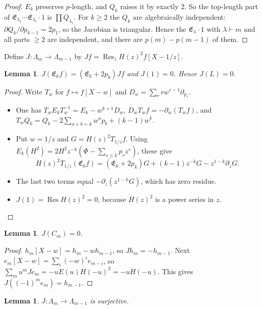 \documentclass[11pt]{article}
\newtheorem{lemma}[theorem]{Lemma}
\theoremstyle{definition}
\theoremstyle{remark}
\newcommand{\La}{\Lambda}
\newcommand{\Res}{\operatorname{Res}}
\newcommand{\fE}{\mathfrak{E}}
\begin{document}
\begin{proof}
$E_k$ preserves $p$-length, and $Q_k$ raises it by exactly $2$. So the top-length part of
$\fE_{\lambda_1}\cdots\fE_{\lambda_l}\cdot1$ is $\prod Q_{\lambda_i}$. For $k\ge2$ the $Q_k$ are algebraically
independent: $\partial Q_k/\partial p_{k-1}=2p_1$, so the Jacobian is triangular. Hence the $\fE_\lambda\cdot1$
with $\lambda\vdash m$ and all parts $\ge2$ are independent, and there are $p(m)-p(m-1)$ of them.
\end{proof}

Define $J\colon\La_m\to\La_{m-1}$ by $Jf=\Res_zH(z)^2f[X-1/z]$.

\begin{lemma}\label{intertw}
$J(\fE_kf)=(\fE_k+2p_k)Jf$ and $J(1)=0$. Hence $J(L)=0$.
\end{lemma}

\begin{proof}
Write $T_w$ for $f\mapsto f[X-w]$ and $D_w=\sum_rrw^{r-1}\partial_{p_r}$.
\begin{itemize}
\item One has $T_wE_kT_w^{-1}=E_k-w^{k+1}D_w$, $D_wT_wf=-\partial_w(T_wf)$, and
$T_wQ_k=Q_k-2\sum_{a+b=k}w^ap_b+(k-1)w^k$.
\item Put $w=1/z$ and $G=H(z)^2T_{1/z}f$. Using $E_k(H^2)=2H^2z^{-k}(\Phi-\sum_{s\le k}p_sz^s)$, these give
\[
  H(z)^2T_{1/z}(\fE_kf)=(\fE_k+2p_k)G+(k-1)z^{-k}G-z^{1-k}\partial_zG .
\]
\item The last two terms equal $-\partial_z(z^{1-k}G)$, which has zero residue.
\item $J(1)=\Res H(z)^2=0$, because $H(z)^2$ is a power series in $z$.
\end{itemize}
\end{proof}

\begin{lemma}\label{Jkill}
$J(C_m)=0$.
\end{lemma}

\begin{proof}
$h_m[X-w]=h_m-wh_{m-1}$, so $Jh_m=-h_{m-1}$. Next $e_m[X-w]=\sum_i(-w)^ie_{m-i}$, so
$\sum_mu^mJe_m=-uE(u)H(-u)^2=-uH(-u)$. This gives $J((-1)^me_m)=h_{m-1}$.
\end{proof}

\begin{lemma}\label{surj}
$J\colon\La_m\to\La_{m-1}$ is surjective.
\end{lemma}
\end{document}
